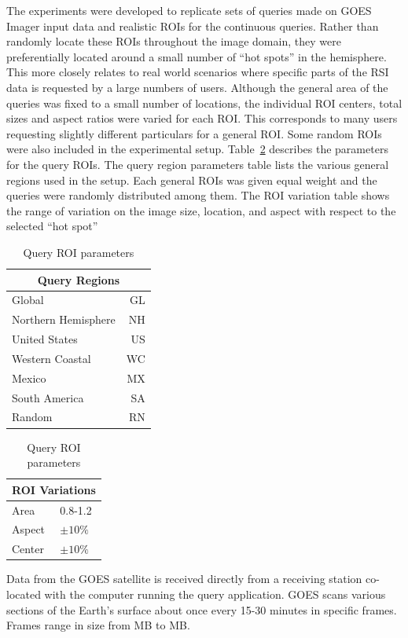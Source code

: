 \documentclass{ucdthesis}       %
\begin{document}
The experiments were developed to replicate sets of queries made on
\ac{GOES} Imager input data and realistic \acp{ROI} for the continuous
queries.  Rather than randomly locate these \acp{ROI} throughout the
image domain, they were preferentially located around a small number
of ``hot spots'' in the hemisphere.  This more closely relates to real
world scenarios where specific parts of the \ac{RSI} data is
requested by a large numbers of users.  Although the general area of
the queries was fixed to a small number of locations, the individual
\ac{ROI} centers, total sizes and aspect ratios were varied for each
\ac{ROI}.  This corresponds to many users requesting slightly
different particulars for a general \ac{ROI}.  Some random \acp{ROI}
were also included in the experimental setup.  Table~\ref{tab:parms}
describes the parameters for the query \acp{ROI}.  The query region
parameters table lists the various general regions used in the
setup. Each general \acp{ROI} was given equal weight and the queries
were randomly distributed among them.  The \ac{ROI} variation table
shows the range of variation on the image size, location, and aspect
with respect to the selected ``hot spot''
%
\begin{table}[htb]
  \centering
  \caption{Query \ac{ROI} parameters}
    \begin{tabular}[t]{lr}
      \multicolumn{2}{c}{Query Regions} \\
      \hline \hline
      Global & GL           \\     
      Northern Hemisphere & NH \\     
      United States & US \\           
      Western Coastal & WC \\        
      Mexico & MX             \\    
      South America & SA \\
      Random & RN
    \end{tabular}
    \quad
    \begin{tabular}[t]{ll}
      \multicolumn{2}{c}{\ac{ROI} Variations} \\
      \hline \hline
      Area & 0.8-1.2 \\
      Aspect & $\pm 10\%$ \\
      Center & $\pm 10\%$ \\ 
    \end{tabular}
  \label{tab:parms}
\end{table}

Data from the \ac{GOES} satellite is received directly from a
receiving station co-located with the computer running the query
application.  \ac{GOES} scans various sections of the Earth's surface
about once every 15-30 minutes in specific frames.  Frames range in
size from \unit[100]{MB} to \unit[440]{MB}.
\end{document}
